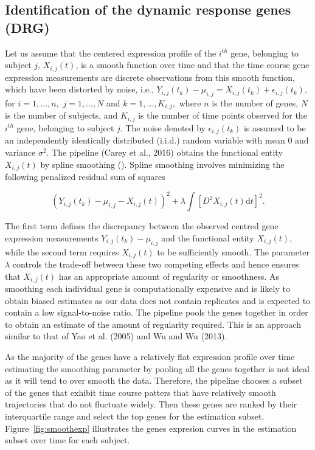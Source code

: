 \subsection{Identification of the dynamic response genes (DRG)}
\label{section:identification_of_drgs}

Let us assume that the centered expression profile of the $i^{th}$ gene, belonging to subject $j$, $X_{i,j}(t)$, is a smooth function over time and that the time course gene expression measurements are discrete observations from this smooth function, which have been distorted by noise, i.e., $Y_{i,j}(t_{k}) -\mu_{i,j} =X_{i,j}(t_{k})+\epsilon_{i,j}(t_{k})$, for $i=1,\ldots,n,$ $j=1,\ldots,N$ and $k=1,\ldots,K_{i,j},$ where $n$ is the number of genes, $N$ is the number of subjects, and $K_{i,j}$ is the number of time points observed for the $i^{th}$ gene, belonging to subject $j$. The noise denoted by $\epsilon_{i,j}(t_{k})$ is assumed to be an independently identically distributed (i.i.d.) random variable with mean $0$ and variance $\sigma^{2}$. The pipeline (Carey et al., 2016) obtains the functional entity $X_{i,j}(t)$ by spline smoothing (\cite{green1993nonparametric,silverman2005functional}). Spline smoothing involves minimizing the following penalized residual sum of squares 

\begin{equation}
\label{eq:res_sum_squares}
(Y_{i,j}(t_{k}) -\mu_{i,j} - X_{i,j}(t))^{2} + \lambda \int \left[D^{2} X_{i,j}(t) \textrm{d}t\right]^{2}.
\end{equation}

The first term defines the discrepancy between the observed centred gene expression measurements $Y_{i,j}(t_{k}) -\mu_{i,j}$ and the functional entity $X_{i,j}(t),$ while the second term requires $X_{i,j}(t)$ to be sufficiently smooth. The parameter $\lambda$ controls the trade-off between these two competing effects and hence ensures that $X_{i,j}(t)$ has an appropriate amount of regularity or smoothness. As smoothing each individual gene is computationally expensive and is likely to obtain biased estimates as our data does not contain replicates and is expected to contain a low signal-to-noise ratio. The pipeline pools the genes together in order to obtain an estimate of the amount of regularity required. This is an approach similar to that of Yao et al. (2005) and Wu and Wu (2013).

As the majority of the genes have a relatively flat expression profile over time estimating the smoothing parameter by pooling all the genes together is not ideal as it will tend to over smooth the data. Therefore, the pipeline chooses a subset of the genes that exhibit time course patters that have relatively smooth trajectories that do not fluctuate widely. Then these genes are ranked by their interquartile range and select the top genes for the estimation subset. Figure~\ref{fig:smoothexp} illustrates the genes expresion curves in the estimation subset over time for each subject. 

